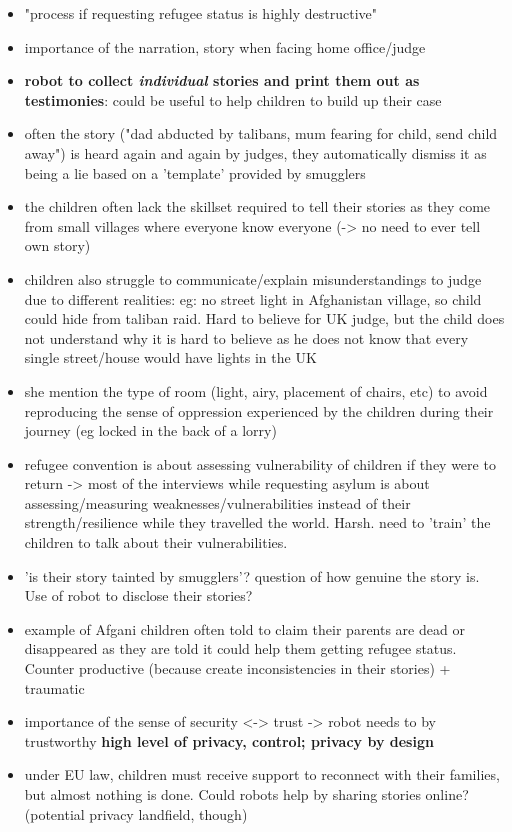 \documentclass[]{article}
\begin{document}
\begin{itemize}
    \item "process if requesting refugee status is highly destructive"
    \item importance of the narration, story when facing home office/judge
    \item \textbf{robot to collect \emph{individual} stories and print them out as
        testimonies}: could be useful to help children to build up their case
    \item often the story ("dad abducted by talibans, mum fearing for child,
        send child away") is heard again and again by judges, they automatically
        dismiss it as being a lie based on a 'template' provided by smugglers
    \item the children often lack the skillset required to tell their stories as
        they come from small villages where everyone know everyone (-> no need
        to ever tell own story)
    \item children also struggle to communicate/explain misunderstandings to
        judge due to different realities: eg: no street light in Afghanistan
        village, so child could hide from taliban raid. Hard to believe for UK
        judge, but the child does not understand why it is hard to believe as he
        does not know that every single street/house would have lights in the UK
    \item she mention the type of room (light, airy, placement of chairs, etc)
        to avoid reproducing the sense of oppression experienced by the children
        during their journey (eg locked in the back of a lorry)
    \item refugee convention is about assessing vulnerability of children if
        they were to return -> most of the interviews while requesting asylum is
        about assessing/measuring weaknesses/vulnerabilities instead of their
        strength/resilience while they travelled the world. Harsh. need to
        'train' the children to talk about their vulnerabilities.
    \item 'is their story tainted by smugglers'? question of how genuine the
        story is. Use of robot to disclose their stories?
    \item example of Afgani children often told to claim their parents are dead
        or disappeared as they are told it could help them getting refugee
        status. Counter productive (because create inconsistencies in their
        stories) + traumatic
    \item importance of the sense of security <-> trust -> robot needs to by
        trustworthy \textbf{high level of privacy, control; privacy by design}
    \item under EU law, children must receive support to reconnect with their
        families, but almost nothing is done. Could robots help by sharing
        stories online? (potential privacy landfield, though)
\end{itemize}
\end{document}
